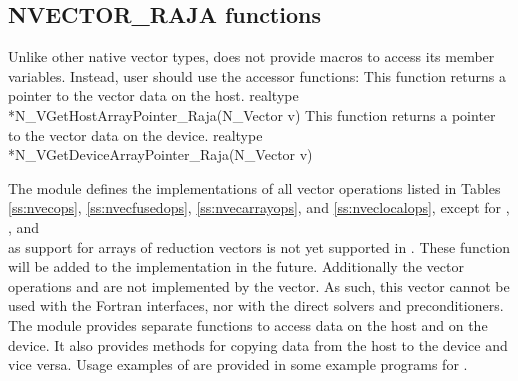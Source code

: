 \subsection{NVECTOR\_RAJA functions}
\label{ss:nvec_raja_functions}

Unlike other native {\sundials} vector types, {\nvecraja} does not provide macros
to access its member variables. Instead, user should use the accessor functions:
{
  This function returns a pointer to the vector data on the host.
}
{
  realtype *N\_VGetHostArrayPointer\_Raja(N\_Vector v)
}
{
  This function returns a pointer to the vector data on the device.
}
{
  realtype *N\_VGetDeviceArrayPointer\_Raja(N\_Vector v)
}

The {\nvecraja} module defines the implementations of all vector operations listed
in Tables \ref{ss:nvecops}, \ref{ss:nvecfusedops}, \ref{ss:nvecarrayops},
and \ref{ss:nveclocalops}, except
for , , and \\ \noindent
{} as support for arrays of reduction vectors is not
yet supported in {\raja}. These function will be added to the {\nvecraja}
implementation in the future. Additionally the vector operations  and
 are not implemented by the {\raja} vector.
As such, this vector cannot be used with the {\sundials} Fortran interfaces,
nor with the {\sundials} direct solvers and preconditioners.
The {\nvecraja} module provides separate functions to access data on the host
and on the device. It also provides methods for copying data from the host to
the device and vice versa. Usage examples of {\nvecraja} are provided in
some example programs for {\cvode} \cite{cvode_ex}.


